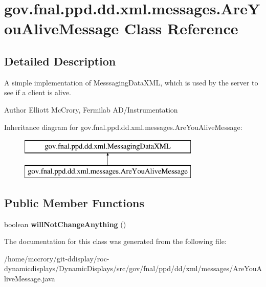 \hypertarget{classgov_1_1fnal_1_1ppd_1_1dd_1_1xml_1_1messages_1_1AreYouAliveMessage}{\section{gov.\-fnal.\-ppd.\-dd.\-xml.\-messages.\-Are\-You\-Alive\-Message Class Reference}
\label{classgov_1_1fnal_1_1ppd_1_1dd_1_1xml_1_1messages_1_1AreYouAliveMessage}
}


\subsection{Detailed Description}
A simple implementation of Messsaging\-Data\-X\-M\-L, which is used by the server to see if a client is alive.

\begin{DoxyAuthor}{Author}
Elliott Mc\-Crory, Fermilab A\-D/\-Instrumentation 
\end{DoxyAuthor}
Inheritance diagram for gov.\-fnal.\-ppd.\-dd.\-xml.\-messages.\-Are\-You\-Alive\-Message\-:\begin{figure}[H]
\begin{center}
\leavevmode
\includegraphics[height=2.000000cm]{classgov_1_1fnal_1_1ppd_1_1dd_1_1xml_1_1messages_1_1AreYouAliveMessage}
\end{center}
\end{figure}
\subsection*{Public Member Functions}
\begin{DoxyCompactItemize}
\item 
\hypertarget{classgov_1_1fnal_1_1ppd_1_1dd_1_1xml_1_1messages_1_1AreYouAliveMessage_ad0e98dae9fd49f343fc3d8448f6af7e1}{boolean {\bfseries will\-Not\-Change\-Anything} ()}\label{classgov_1_1fnal_1_1ppd_1_1dd_1_1xml_1_1messages_1_1AreYouAliveMessage_ad0e98dae9fd49f343fc3d8448f6af7e1}

\end{DoxyCompactItemize}


The documentation for this class was generated from the following file\-:\begin{DoxyCompactItemize}
\item 
/home/mccrory/git-\/ddisplay/roc-\/dynamicdisplays/\-Dynamic\-Displays/src/gov/fnal/ppd/dd/xml/messages/Are\-You\-Alive\-Message.\-java\end{DoxyCompactItemize}
